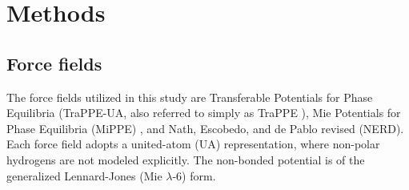 \documentclass[journal=jced,manuscript=article]{achemso}
\begin{document}

\section{Methods} \label{sec: Methods}

\subsection{Force fields} \label{sec: Force fields}

    The force fields utilized in this study are Transferable Potentials for Phase Equilibria (TraPPE-UA, also referred to simply as TraPPE \cite{TraPPE,Martin1999,TraPPEUA2}), Mie Potentials for Phase Equilibria (MiPPE) \cite{Mie,Potoff_branched}, and Nath, Escobedo, and de Pablo revised (NERD). Each force field adopts a united-atom (UA) representation, where non-polar hydrogens are not modeled explicitly. The non-bonded potential is of the generalized Lennard-Jones (Mie $\lambda$-6) form. 
    
\end{document}
